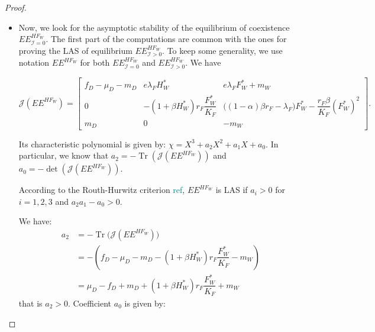 \documentclass{article}
\newcommand{\lfw}{\lambda_{F}}
\newcommand{\lfw}{\lambda_{F}}
\newcommand{\cI}{\mathcal{I}}
\newcommand{\marc}[1]{\textcolor{teal}{#1}}
\DeclareMathOperator{\Tr}{Tr}
\begin{document}
\begin{proof}
\begin{itemize}
\item Now, we look for the asymptotic stability of the equilibrium of coexistence $EE^{HF_W}_{\cI=0}$. The first part of the computations are common with the ones for proving the LAS of equilibrium $EE^{HF_W}_{\cI >0}$. To keep some generality, we use notation $EE^{HF_W}$ for both $EE^{HF_W}_{\cI =0}$ and $EE^{HF_W}_{\cI >0}$. We have


\begin{equation*}
\mathcal{J}(EE^{H F_W}) = \begin{bmatrix}
f_D -\mu_D - m_D & e \lfw H_W^* & e \lfw F^*_W +m_W \\
0 & -(1 + \beta H_W^*)r_F \dfrac{F_W^*}{K_F} & \big( (1-\alpha)\beta r_F - \lfw \big) F_W^* -  \dfrac{r_F\beta}{K_F} (F_W^*)^2 \\
m_D & 0 & -m_W
\end{bmatrix}.
\end{equation*} 

Its characteristic polynomial is given by: $\chi = X^3 + a_2 X^2 + a_1 X + a_0$. In particular, we know that $a_2 = - \Tr(\mathcal{J}(EE^{H F_W}))$ and $a_0 = - \det (\mathcal{J}(EE^{H F_W}))$.

According to the Routh-Hurwitz criterion \marc{ref}, $EE^{H F_W}$ is LAS if $a_i > 0$ for $i=1,2,3$ and $a_2 a_1 - a_0 > 0$.

We have:
\begin{align}
a_2 &= - \Tr\Big(\mathcal{J}(EE^{H F_W})\Big) \\
 &= -(f_D - \mu_D - m_D - (1+\beta H_W^*)r_F \dfrac{F_W^*}{K_F} - m_W) \\
 &= \mu_D - f_D + m_D + (1+\beta H_W^*)r_F \dfrac{F_W^*}{K_F} + m_W \label{expressionA2}
\end{align}
that is $a_2>0$. Coefficient $a_0$ is given by:


\end{itemize}
\end{proof}
\end{document}
